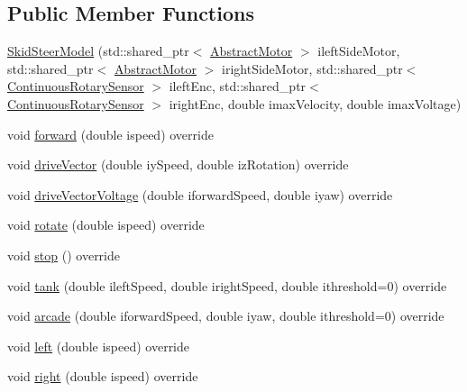 \subsection*{Public Member Functions}
\begin{DoxyCompactItemize}
\item 
\mbox{\hyperlink{classokapi_1_1SkidSteerModel_ac79ebd9b643ea68da98576ec355e94a5}{Skid\+Steer\+Model}} (std\+::shared\+\_\+ptr$<$ \mbox{\hyperlink{classokapi_1_1AbstractMotor}{Abstract\+Motor}} $>$ ileft\+Side\+Motor, std\+::shared\+\_\+ptr$<$ \mbox{\hyperlink{classokapi_1_1AbstractMotor}{Abstract\+Motor}} $>$ iright\+Side\+Motor, std\+::shared\+\_\+ptr$<$ \mbox{\hyperlink{classokapi_1_1ContinuousRotarySensor}{Continuous\+Rotary\+Sensor}} $>$ ileft\+Enc, std\+::shared\+\_\+ptr$<$ \mbox{\hyperlink{classokapi_1_1ContinuousRotarySensor}{Continuous\+Rotary\+Sensor}} $>$ iright\+Enc, double imax\+Velocity, double imax\+Voltage)
\item 
void \mbox{\hyperlink{classokapi_1_1SkidSteerModel_a74ca9d9f1b0f80c9453194567c58e967}{forward}} (double ispeed) override
\item 
void \mbox{\hyperlink{classokapi_1_1SkidSteerModel_a5fa39473f6a6d2deae988f63e972b66a}{drive\+Vector}} (double iy\+Speed, double iz\+Rotation) override
\item 
void \mbox{\hyperlink{classokapi_1_1SkidSteerModel_aa9b68af25f8f924117b07a5c8e9f6c93}{drive\+Vector\+Voltage}} (double iforward\+Speed, double iyaw) override
\item 
void \mbox{\hyperlink{classokapi_1_1SkidSteerModel_af02dab85c80cf8aa226b33a39851feff}{rotate}} (double ispeed) override
\item 
void \mbox{\hyperlink{classokapi_1_1SkidSteerModel_a98d212cff8bad647ada6bcd3054c7581}{stop}} () override
\item 
void \mbox{\hyperlink{classokapi_1_1SkidSteerModel_aa51195896f1be6afe661d5c9a8e6ea4e}{tank}} (double ileft\+Speed, double iright\+Speed, double ithreshold=0) override
\item 
void \mbox{\hyperlink{classokapi_1_1SkidSteerModel_a145f671aa2dd1c6991945929e4a3d97d}{arcade}} (double iforward\+Speed, double iyaw, double ithreshold=0) override
\item 
void \mbox{\hyperlink{classokapi_1_1SkidSteerModel_af2b00108853b82eb0fb5ecb3b71f413d}{left}} (double ispeed) override
\item 
void \mbox{\hyperlink{classokapi_1_1SkidSteerModel_ada9bd222b5aeaa0507b57906ac59dd3b}{right}} (double ispeed) override
\item 

\end{DoxyCompactItemize}
